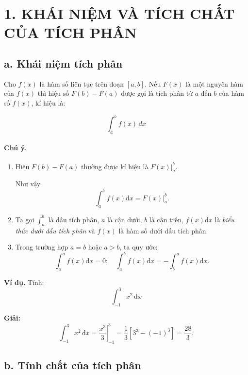 \section*{1. KHÁI NIỆM VÀ TÍCH CHẤT CỦA TÍCH PHÂN}

\subsection*{a. Khái niệm tích phân}

Cho $f(x)$ là hàm số liên tục trên đoạn $[a, b]$. Nếu $F(x)$ là một nguyên hàm của $f(x)$ thì hiệu số $F(b) - F(a)$ được gọi là tích phân từ $a$ đến $b$ của hàm số $f(x)$, kí hiệu là:

\[
\int_{a}^{b} f(x) \, dx
\]

\paragraph{Chú ý.}

\begin{enumerate}
    \item[1)] Hiệu $F(b) - F(a)$ thường được kí hiệu là $\left. F(x) \right|_a^b$.
    
    Như vậy
    \[
    \int_a^b f(x)\mathrm{d}x = \left. F(x) \right|_a^b.
    \]

    \item[2)] Ta gọi $\displaystyle\int_a^b$ là dấu tích phân, $a$ là cận dưới, $b$ là cận trên, $f(x)\mathrm{d}x$ là \textit{biểu thức dưới dấu tích phân} và $f(x)$ là hàm số dưới dấu tích phân.

    \item[3)] Trong trường hợp $a = b$ hoặc $a > b$, ta quy ước:
    \[
    \int_a^a f(x)\mathrm{d}x = 0; \quad \int_a^b f(x)\mathrm{d}x = -\int_b^a f(x)\mathrm{d}x.
    \]
\end{enumerate}

\noindent\textbf{Ví dụ.} Tính:
\[
\int_{-1}^{3} x^2 \, \mathrm{d}x
\]

\noindent\textbf{Giải:}
\[
\int_{-1}^{3} x^2 \, \mathrm{d}x = \left. \frac{x^3}{3} \right|_{-1}^{3} = \frac{1}{3} \left[ 3^3 - (-1)^3 \right] = \frac{28}{3}.
\]

\subsection*{b. Tính chất của tích phân}

